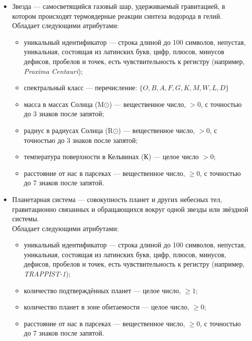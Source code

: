\documentclass[14pt,a4paper]{extarticle}
\begin{document}
\begin{itemize}
		\item Звезда --- самосветящийся газовый шар, удерживаемый гравитацией, в котором происходят термоядерные реакции синтеза водорода в гелий.\\
		Обладает следующими атрибутами:
		\begin{itemize}
			\item уникальный идентификатор --- строка длиной до 100 символов, непустая, уникальная, состоящая из латинских букв, цифр, плюсов, минусов дефисов, пробелов и точек, есть чувствительность к регистру (например, \textit{Proxima Centauri});
			\item спектральный класс --- перечисление: $\{O, B, A, F, G, K, M, W, L, D\}$ \cite{stellar-classes}%
			\item масса в массах Солнца (M$\odot$) --- вещественное число, $> 0$, с точностью до 3 знаков после запятой;
			\item радиус в радиусах Солнца (R$\odot$) --- вещественное число, $> 0$, с точностью до 3 знаков после запятой;
			\item температура поверхности в Кельвинах (К) --- целое число $> 0$;
			\item расстояние от нас в парсеках --- вещественное число, $\geq 0$, с точностью до 7 знаков после запятой.
		\end{itemize}
		
		\item Планетарная система --- совокупность планет и других небесных тел, гравитационно связанных и обращающихся вокруг одной звезды или звёздной системы.\\
		Обладает следующими атрибутами:
		\begin{itemize}
			\item уникальный идентификатор --- строка длиной до 100 символов, непустая, уникальная, состоящая из латинских букв, цифр, плюсов, минусов, дефисов, пробелов и точек, есть чувствительность к регистру (например, \textit{TRAPPIST-1});
			\item количество подтверждённых планет --- целое число, $\geq 1$;
			\item количество планет в зоне обитаемости --- целое число, $\geq 0$;
			\item расстояние от нас в парсеках --- вещественное число, $\geq 0$, с точностью до 7 знаков после запятой.
		\end{itemize}
		

\end{itemize}
\end{document}
